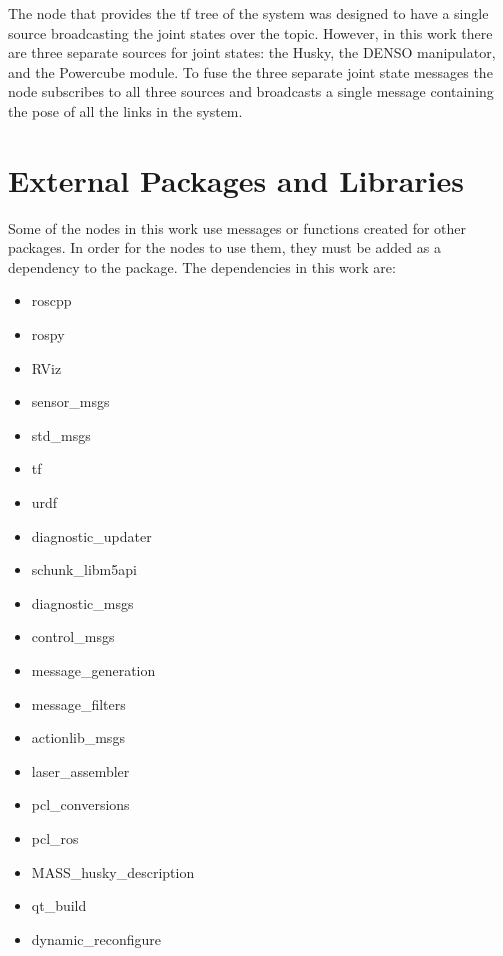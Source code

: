 The  node that provides the tf tree of the system was designed to have a single source broadcasting the joint states over the  topic. However, in this work there are three separate sources for joint states: the Husky, the DENSO manipulator, and the Powercube module. To fuse the three separate joint state messages the  node subscribes to all three sources and broadcasts a single message containing the pose of all the links in the system.\\
\section{External Packages and Libraries}
\label{sec:extpkg}
Some of the nodes in this work use messages or functions created for other packages. In order for the nodes to use them, they must be added as a dependency to the package. The dependencies in this work are:

\begin{itemize}
\item roscpp
\item rospy
\item RViz
\item sensor\_msgs
\item std\_msgs
\item tf
\item urdf 
\item diagnostic\_updater
\item schunk\_libm5api
\item diagnostic\_msgs
\item control\_msgs
\item message\_generation
\item message\_filters
\item actionlib\_msgs
\item laser\_assembler
\item pcl\_conversions 
\item pcl\_ros 
\item MASS\_husky\_description
\item qt\_build
\item dynamic\_reconfigure
\end{itemize}